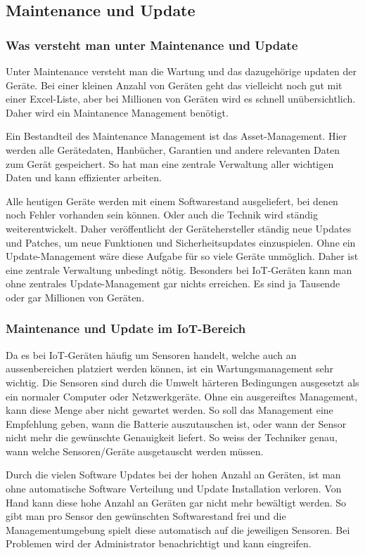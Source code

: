 \subsection{Maintenance und Update}
\subsubsection{Was versteht man unter Maintenance und Update}
Unter Maintenance versteht man die Wartung und das dazugehörige updaten der Geräte. Bei einer kleinen Anzahl von Geräten geht das vielleicht noch gut mit einer Excel-Liste, aber bei Millionen von Geräten wird es schnell unübersichtlich. Daher wird ein Maintanence Management benötigt.

Ein Bestandteil des Maintenance Management ist das Asset-Management. Hier werden alle Gerätedaten, Hanbücher, Garantien und andere relevanten Daten zum Gerät gespeichert.\cite{MainAsset} So hat man eine zentrale Verwaltung aller wichtigen Daten und kann effizienter arbeiten.

Alle heutigen Geräte werden mit einem Softwarestand ausgeliefert, bei denen noch Fehler vorhanden sein können. Oder auch die Technik wird ständig weiterentwickelt. Daher veröffentlicht der Gerätehersteller ständig neue Updates und Patches, um neue Funktionen und Sicherheitsupdates einzuspielen. Ohne ein Update-Management wäre diese Aufgabe für so viele Geräte unmöglich. Daher ist eine zentrale Verwaltung unbedingt nötig. Besonders bei IoT-Geräten kann man ohne zentrales Update-Management gar nichts erreichen. Es sind ja Tausende oder gar Millionen von Geräten.
\subsubsection{Maintenance und Update im IoT-Bereich}
Da es bei IoT-Geräten häufig um Sensoren handelt, welche auch an aussenbereichen platziert werden können, ist ein Wartungsmanagement sehr wichtig. Die Sensoren sind durch die Umwelt härteren Bedingungen ausgesetzt als ein normaler Computer oder Netzwerkgeräte. Ohne ein ausgereiftes Management, kann diese Menge aber nicht gewartet werden. So soll das Management eine Empfehlung geben, wann die Batterie auszutauschen ist, oder wann der Sensor nicht mehr die gewünschte Genauigkeit liefert. So weiss der Techniker genau, wann welche Sensoren/Geräte ausgetauscht werden müssen.

Durch die vielen Software Updates bei der hohen Anzahl an Geräten, ist man ohne automatische Software Verteilung und Update Installation verloren. Von Hand kann diese hohe Anzahl an Geräten gar nicht mehr bewältigt werden. So gibt man pro Sensor den gewünschten Softwarestand frei und die Managementumgebung spielt diese automatisch auf die jeweiligen Sensoren. Bei Problemen wird der Administrator benachrichtigt und kann eingreifen.

